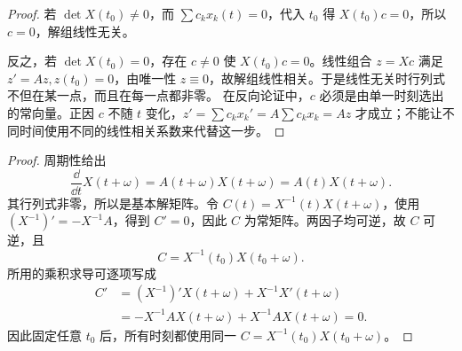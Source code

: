 \begin{proof}
若 $\det X(t_0)\ne0$，而 $\sum c_kx_k(t)=0$，代入 $t_0$ 得 $X(t_0)c=0$，所以 $c=0$，解组线性无关。

反之，若 $\det X(t_0)=0$，存在 $c\ne0$ 使 $X(t_0)c=0$。线性组合 $z=Xc$ 满足 $z'=Az,z(t_0)=0$，由唯一性 $z\equiv0$，故解组线性相关。于是线性无关时行列式不但在某一点，而且在每一点都非零。
在反向论证中，$c$ 必须是由单一时刻选出的常向量。正因 $c$ 不随 $t$ 变化，$z'=\sum c_kx_k'=A\sum c_kx_k=Az$ 才成立；不能让不同时间使用不同的线性相关系数来代替这一步。
\end{proof}
\begin{proof}
周期性给出
\[
 \dfrac\dd{\dd t}X(t+\omega)=A(t+\omega)X(t+\omega)=A(t)X(t+\omega).
\]
其行列式非零，所以是基本解矩阵。令 $C(t)=X^{-1}(t)X(t+\omega)$，使用 $(X^{-1})'=-X^{-1}A$，得到 $C'=0$，因此 $C$ 为常矩阵。两因子均可逆，故 $C$ 可逆，且
\[
 C=X^{-1}(t_0)X(t_0+\omega).
\]
所用的乘积求导可逐项写成
\[
\begin{aligned}
C'&=(X^{-1})'X(t+\omega)+X^{-1}X'(t+\omega)\\
&=-X^{-1}AX(t+\omega)+X^{-1}AX(t+\omega)=0.
\end{aligned}
\]
因此固定任意 $t_0$ 后，所有时刻都使用同一 $C=X^{-1}(t_0)X(t_0+\omega)$。
\end{proof}
